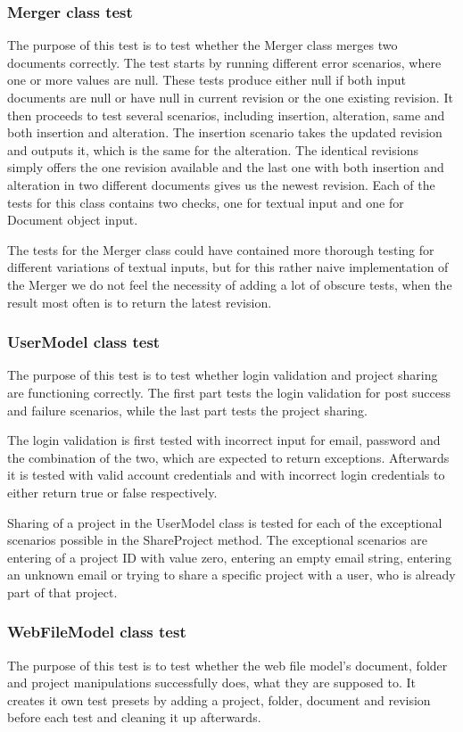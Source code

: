 \subsubsection{Merger class test}
The purpose of this test is to test whether the Merger class merges two documents correctly. The test starts by running different error scenarios, where one or more values are null. These tests produce either null if both input documents are null or have null in current revision or the one existing revision.
It then proceeds to test several scenarios, including insertion, alteration, same and both insertion and alteration. The insertion scenario takes the updated revision and outputs it, which is the same for the alteration. The identical revisions simply offers the one revision available and the last one with both insertion and alteration in two different documents gives us the newest revision. Each of the tests for this class contains two checks, one for textual input and one for Document object input.

The tests for the Merger class could have contained more thorough testing for different variations of textual inputs, but for this rather naive implementation of the Merger we do not feel the necessity of adding a lot of obscure tests, when the result most often is to return the latest revision.

\subsubsection{UserModel class test}
The purpose of this test is to test whether login validation and project sharing are functioning correctly. The first part tests the login validation for post success and failure scenarios, while the last part tests the project sharing.

The login validation is first tested with incorrect input for email, password and the combination of the two, which are expected to return exceptions. Afterwards it is tested with valid account credentials and with incorrect login credentials to either return true or false respectively.

Sharing of a project in the UserModel class is tested for each of the exceptional scenarios possible in the ShareProject method. The exceptional scenarios are entering of a project ID with value zero, entering an empty email string, entering an unknown email or trying to share a specific project with a user, who is already part of that project.

\subsubsection{WebFileModel class test}
The purpose of this test is to test whether the web file model's document, folder and project manipulations successfully does, what they are supposed to. It creates it own test presets by adding a project, folder, document and revision before each test and cleaning it up afterwards.

